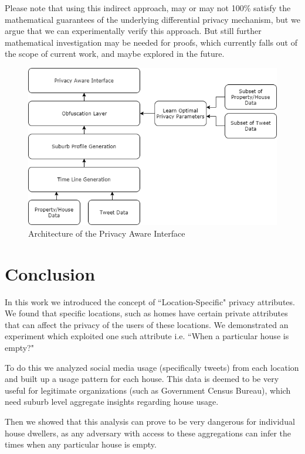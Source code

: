 \documentclass[12pt]{report}
\theoremstyle{named}
\begin{document}
Please note that using this indirect approach, may or may not 100\% satisfy the mathematical guarantees of the underlying differential privacy mechanism, but we argue that we can experimentally verify this approach. But still further mathematical investigation may be needed for proofs, which currently falls out of the scope of current work, and maybe explored in the future.


\begin{figure}[ht]
\centering
        \includegraphics[width=120mm,scale=1]{Images/ObfuscatedInterface.png}
    \caption{Architecture of the Privacy Aware Interface}
    \label{fig:ObfuscatedInterface}
\end{figure}

\chapter{Conclusion}
In this work we introduced the concept of ``Location-Specific" privacy attributes. We found that specific locations, such as homes have certain private attributes that can affect the privacy of the users of these locations. We demonstrated an experiment which exploited one such attribute i.e. ``When a particular house is empty?"

To do this we analyzed social media usage (specifically tweets) from each location and built up a usage pattern for each house. This data is deemed to be very useful for legitimate organizations (such as Government Census Bureau), which need suburb level aggregate insights regarding house usage.

Then we showed that this analysis can prove to be very dangerous for individual house dwellers, as any adversary with access to these aggregations can infer the times when any particular house is empty.
\end{document}
